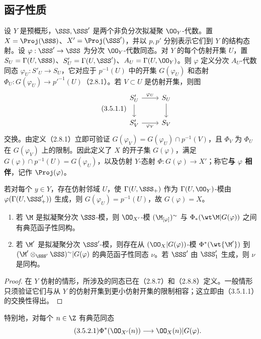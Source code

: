 \subsection{函子性质}
设 $Y$ 是预概形，$\SSS,\SSS'$ 是两个非负分次拟凝聚 $\OO_Y$-代数。置 $X=\Proj(\SSS)$、$X'=\Proj(\SSS')$，并以 $p,p'$ 分别表示它们到 $Y$ 的结构态射。设 $\varphi:\SSS'\to\SSS$ 为分次 $\OO_Y$-代数同态。对 $Y$ 的每个仿射开集 $U$，置 $S_U=\Gamma(U,\SSS)$、$S'_U=\Gamma(U,\SSS')$、$A_U=\Gamma(U,\OO_Y)$。则 $\varphi$ 定义分次 $A_U$-代数同态 $\varphi_U:S'_U\to S_U$，它对应于 $p^{-1}(U)$ 中的开集 $G(\varphi_U)$ 和态射
$\Phi_U:G(\varphi_U)\to p'^{-1}(U)$（2.8.1）。若 $V\subset U$ 是仿射开集，则图
\begin{equation}\tag{3.5.1.1}
\begin{tikzcd}
S'_U \arrow[r,"\varphi_U"] \arrow[d] & S_U \arrow[d]\\
S'_V \arrow[r,"\varphi_V"'] & S_V
\end{tikzcd}
\end{equation}
交换。由定义（2.8.1）立即可验证
$G(\varphi_V)=G(\varphi_U)\cap p^{-1}(V)$，且 $\Phi_V$ 为 $\Phi_U$ 在 $G(\varphi_V)$ 上的限制。因此定义了 $X$ 的开子集 $G(\varphi)$，满足
$G(\varphi)\cap p^{-1}(U)=G(\varphi_U)$，以及仿射 $Y$-态射
$\Phi:G(\varphi)\to X'$；称它\textbf{与 $\varphi$ 相伴}，记作 $\Proj(\varphi)$。

若对每个 $y\in Y$，存在仿射邻域 $U$，使 $\Gamma(U,\SSS_+)$ 作为 $\Gamma(U,\OO_Y)$-模由 $\varphi(\Gamma(U,\SSS'_+))$ 生成，则 $G(\varphi_U)=p^{-1}(U)$，故 $G(\varphi)=X$。

\begin{enumerate}[label=(\roman*)]
\item 若 $\M$ 是拟凝聚分次 $\SSS$-模，则 $\OO_{X'}$-模 $(\M_{[\varphi]})^\sim$ 与 $\Phi_*(\wt\M|G(\varphi))$ 之间有典范函子性同构。
\item 若 $\M'$ 是拟凝聚分次 $\SSS'$-模，则存在从 $(\OO_X|G(\varphi))$-模 $\Phi^*(\wt{\M'})$ 到
$(\M'\otimes_{\SSS'}\SSS)^\sim|G(\varphi)$ 的典范函子性同态 $\nu$。若 $\SSS'$ 由 $\SSS'_1$ 生成，则 $\nu$ 是同构。
\end{enumerate}
\begin{proof}
在 $Y$ 仿射的情形，所涉及的同态已在（2.8.7）和（2.8.8）定义。一般情形只须验证它们与从 $Y$ 的仿射开集到更小仿射开集的限制相容；这立即由（3.5.1.1）的交换性得出。
\end{proof}
特别地，对每个 $n\in\Z$ 有典范同态
\begin{equation}\tag{3.5.2.1}
\Phi^*(\OO_{X'}(n))\longrightarrow\OO_X(n)|G(\varphi).
\end{equation}

